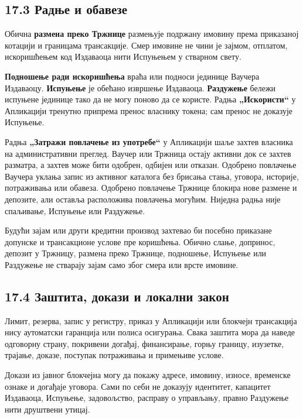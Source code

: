 \documentclass[11pt]{article}
\begin{document}
\subsection*{17.3 Радње и обавезе}

Обична \textbf{размена преко Тржнице} размењује подржану имовину према приказаној котацији и границама трансакције. Смер имовине не чини је зајмом, отплатом, искоришћењем код Издаваоца нити Испуњењем у стварном свету.

\textbf{Подношење ради искоришћења} враћа или подноси јединице Ваучера Издаваоцу. \textbf{Испуњење} је обећано извршење Издаваоца. \textbf{Раздужење} бележи испуњене јединице тако да не могу поново да се користе. Радња \textbf{„Искористи``} у Апликацији тренутно припрема пренос власнику токена; сам пренос не доказује Испуњење.

Радња \textbf{„Затражи повлачење из употребе``} у Апликацији шаље захтев власника на административни преглед. Ваучер или Тржница остају активни док се захтев разматра, а захтев може бити одобрен, одбијен или отказан. Одобрено повлачење Ваучера уклања запис из активног каталога без брисања стања, уговора, историје, потраживања или обавеза. Одобрено повлачење Тржнице блокира нове размене и депозите, али оставља расположива повлачења могућим. Ниједна радња није спаљивање, Испуњење или Раздужење.

Будући зајам или други кредитни производ захтевао би посебно приказане допунске и трансакционе услове пре коришћења. Обично слање, допринос, депозит у Тржницу, размена преко Тржнице, подношење, Испуњење или Раздужење не стварају зајам само због смера или врсте имовине.

\subsection*{17.4 Заштита, докази и локални закон}

Лимит, резерва, запис у регистру, приказ у Апликацији или блокчејн трансакција нису аутоматски гаранција или полиса осигурања. Свака заштита мора да наведе одговорну страну, покривени догађај, финансирање, горњу границу, изузетке, трајање, доказе, поступак потраживања и примењиве услове.

Докази из јавног блокчејна могу да покажу адресе, имовину, износе, временске ознаке и догађаје уговора. Сами по себи не доказују идентитет, капацитет Издаваоца, Испуњење, задовољство, расправу о управљању, правно Раздужење нити друштвени утицај.
\end{document}
